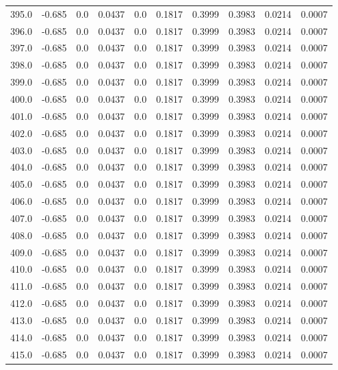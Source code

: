 \begin{longtable}{lrrrrrrrrr}
395.0 & -0.685 & 0.0 & 0.0437 & 0.0 & 0.1817 & 0.3999 & 0.3983 & 0.0214 & 0.0007 \\
396.0 & -0.685 & 0.0 & 0.0437 & 0.0 & 0.1817 & 0.3999 & 0.3983 & 0.0214 & 0.0007 \\
397.0 & -0.685 & 0.0 & 0.0437 & 0.0 & 0.1817 & 0.3999 & 0.3983 & 0.0214 & 0.0007 \\
398.0 & -0.685 & 0.0 & 0.0437 & 0.0 & 0.1817 & 0.3999 & 0.3983 & 0.0214 & 0.0007 \\
399.0 & -0.685 & 0.0 & 0.0437 & 0.0 & 0.1817 & 0.3999 & 0.3983 & 0.0214 & 0.0007 \\
400.0 & -0.685 & 0.0 & 0.0437 & 0.0 & 0.1817 & 0.3999 & 0.3983 & 0.0214 & 0.0007 \\
401.0 & -0.685 & 0.0 & 0.0437 & 0.0 & 0.1817 & 0.3999 & 0.3983 & 0.0214 & 0.0007 \\
402.0 & -0.685 & 0.0 & 0.0437 & 0.0 & 0.1817 & 0.3999 & 0.3983 & 0.0214 & 0.0007 \\
403.0 & -0.685 & 0.0 & 0.0437 & 0.0 & 0.1817 & 0.3999 & 0.3983 & 0.0214 & 0.0007 \\
404.0 & -0.685 & 0.0 & 0.0437 & 0.0 & 0.1817 & 0.3999 & 0.3983 & 0.0214 & 0.0007 \\
405.0 & -0.685 & 0.0 & 0.0437 & 0.0 & 0.1817 & 0.3999 & 0.3983 & 0.0214 & 0.0007 \\
406.0 & -0.685 & 0.0 & 0.0437 & 0.0 & 0.1817 & 0.3999 & 0.3983 & 0.0214 & 0.0007 \\
407.0 & -0.685 & 0.0 & 0.0437 & 0.0 & 0.1817 & 0.3999 & 0.3983 & 0.0214 & 0.0007 \\
408.0 & -0.685 & 0.0 & 0.0437 & 0.0 & 0.1817 & 0.3999 & 0.3983 & 0.0214 & 0.0007 \\
409.0 & -0.685 & 0.0 & 0.0437 & 0.0 & 0.1817 & 0.3999 & 0.3983 & 0.0214 & 0.0007 \\
410.0 & -0.685 & 0.0 & 0.0437 & 0.0 & 0.1817 & 0.3999 & 0.3983 & 0.0214 & 0.0007 \\
411.0 & -0.685 & 0.0 & 0.0437 & 0.0 & 0.1817 & 0.3999 & 0.3983 & 0.0214 & 0.0007 \\
412.0 & -0.685 & 0.0 & 0.0437 & 0.0 & 0.1817 & 0.3999 & 0.3983 & 0.0214 & 0.0007 \\
413.0 & -0.685 & 0.0 & 0.0437 & 0.0 & 0.1817 & 0.3999 & 0.3983 & 0.0214 & 0.0007 \\
414.0 & -0.685 & 0.0 & 0.0437 & 0.0 & 0.1817 & 0.3999 & 0.3983 & 0.0214 & 0.0007 \\
415.0 & -0.685 & 0.0 & 0.0437 & 0.0 & 0.1817 & 0.3999 & 0.3983 & 0.0214 & 0.0007 \\

\end{longtable}
